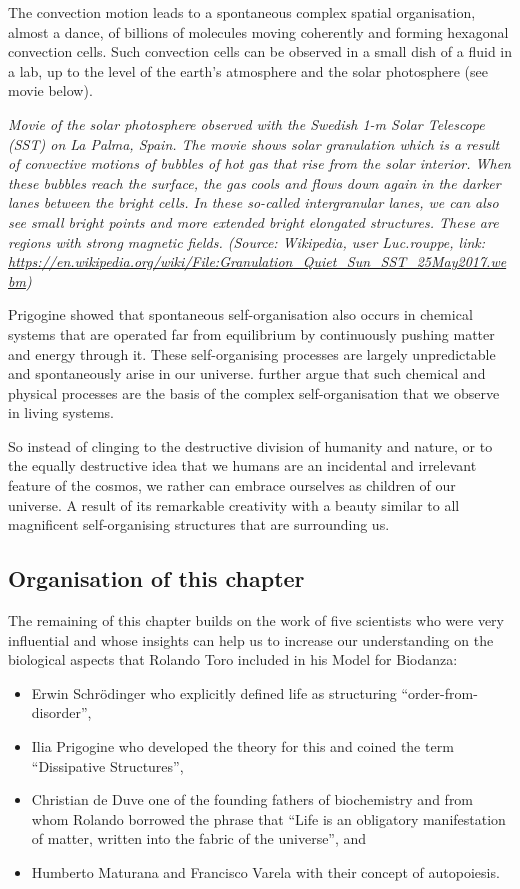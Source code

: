 \documentclass[
  11pt,
]{book}
\providecommand{\tightlist}{%
  \setlength{\itemsep}{0pt}\setlength{\parskip}{0pt}}
\begin{document}
The convection motion leads to a spontaneous complex spatial organisation, almost a dance, of billions of molecules moving coherently and forming hexagonal convection cells. Such convection cells can be observed in a small dish of a fluid in a lab, up to the level of the earth's atmosphere and the solar photosphere (see movie below).

\emph{Movie of the solar photosphere observed with the Swedish 1-m Solar Telescope (SST) on La Palma, Spain. The movie shows solar granulation which is a result of convective motions of bubbles of hot gas that rise from the solar interior. When these bubbles reach the surface, the gas cools and flows down again in the darker lanes between the bright cells. In these so-called intergranular lanes, we can also see small bright points and more extended bright elongated structures. These are regions with strong magnetic fields. (Source: Wikipedia, user Luc.rouppe, link: \url{https://en.wikipedia.org/wiki/File:Granulation_Quiet_Sun_SST_25May2017.webm})}

Prigogine showed that spontaneous self-organisation also occurs in chemical systems that are operated far from equilibrium by continuously pushing matter and energy through it. These self-organising processes are largely unpredictable and spontaneously arise in our universe.
\citet{prigogineStengers1984} further argue that such chemical and physical processes are the basis of the complex self-organisation that we observe in living systems.

So instead of clinging to the destructive division of humanity and nature, or to the equally destructive idea that we humans are an incidental and irrelevant feature of the cosmos, we rather can embrace ourselves as children of our universe. A result of its remarkable creativity with a beauty similar to all magnificent self-organising structures that are surrounding us.

\hypertarget{organisation-of-this-chapter}{%
\subsection{Organisation of this chapter}\label{organisation-of-this-chapter}}

The remaining of this chapter builds on the work of five scientists who were very influential and whose insights can help us to increase our understanding on the biological aspects that Rolando Toro included in his Model for Biodanza:

\begin{itemize}
\tightlist
\item
  Erwin Schrödinger who explicitly defined life as structuring ``order-from-disorder'',
\item
  Ilia Prigogine who developed the theory for this and coined the term ``Dissipative Structures'',
\item
  Christian de Duve one of the founding fathers of biochemistry and from whom Rolando borrowed the phrase that ``Life is an obligatory manifestation of matter, written into the fabric of the universe'', and
\item
  Humberto Maturana and Francisco Varela with their concept of autopoiesis.
\end{itemize}
\end{document}
